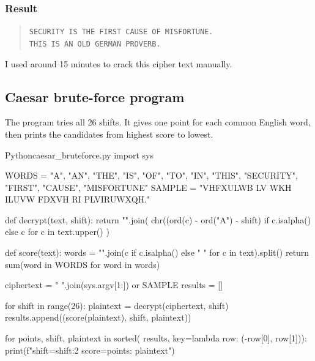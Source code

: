             \subsubsection{Result}
                \begin{quote}
                    \texttt{SECURITY IS THE FIRST CAUSE OF MISFORTUNE.}\\
                    \texttt{THIS IS AN OLD GERMAN PROVERB.}
                \end{quote}

            \begin{notebox}[Note]
                I used around 15 minutes to crack this cipher text manually.
            \end{notebox}

    \pagebreak

        \subsection{Caesar brute-force program}

            The program tries all 26 shifts. It gives one point for each common English word,
            then prints the candidates from highest score to lowest.

            \begin{codeblock}[]{Python}{caesar\_bruteforce.py}
                import sys

                WORDS = {"A", "AN", "THE", "IS", "OF", "TO", "IN", "THIS",
                         "SECURITY", "FIRST", "CAUSE", "MISFORTUNE"}
                SAMPLE = "VHFXULWB LV WKH ILUVW FDXVH RI PLVIRUWXQH."


                def decrypt(text, shift):
                    return "".join(
                        chr((ord(c) - ord("A") - shift) %
                        if c.isalpha() else c
                        for c in text.upper()
                    )


                def score(text):
                    words = "".join(c if c.isalpha() else " " for c in text).split()
                    return sum(word in WORDS for word in words)


                ciphertext = " ".join(sys.argv[1:]) or SAMPLE
                results = []

                for shift in range(26):
                    plaintext = decrypt(ciphertext, shift)
                    results.append((score(plaintext), shift, plaintext))

                for points, shift, plaintext in sorted(
                        results, key=lambda row: (-row[0], row[1])):
                    print(f"shift={shift:2} score={points}: {plaintext}")
            \end{codeblock}

